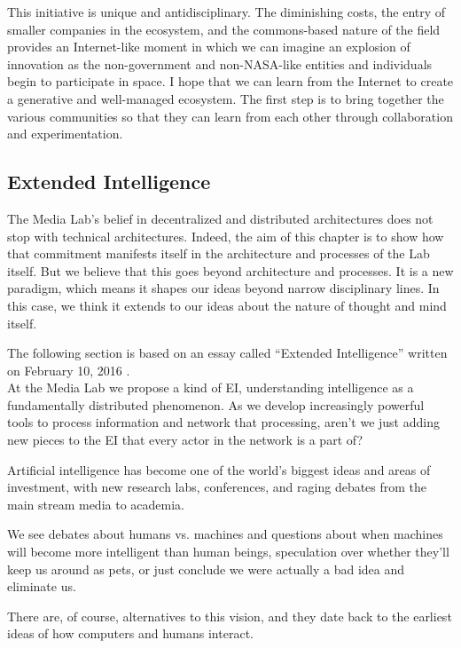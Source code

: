 This initiative is unique and antidisciplinary. The diminishing costs, the entry of smaller companies in the ecosystem, and the commons-based nature of the field provides an Internet-like moment in which we can imagine an explosion of innovation as the non-government and non-\ac{NASA}-like entities and individuals begin to participate in space. I hope that we can learn from the Internet to create a generative and well-managed ecosystem. The first step is to bring together the various communities so that they can learn from each other through collaboration and experimentation.

\subsection{Extended Intelligence}

The Media Lab's belief in decentralized and distributed architectures does not stop with technical architectures. Indeed, the aim of this chapter is to show how that commitment manifests itself in the architecture and processes of the Lab itself. But we believe that this goes beyond architecture and processes. It is a new paradigm, which means it shapes our ideas beyond narrow disciplinary lines. In this case, we think it extends to our ideas about the nature of thought and mind itself.

The following section is based on an essay called ``Extended Intelligence'' written on February 10, 2016 \cite{Extended52:online}. \\

At the Media Lab we propose a kind of \ac{EI}, understanding intelligence as a fundamentally distributed phenomenon. As we develop increasingly powerful tools to process information and network that processing, aren't we just adding new pieces to the \ac{EI} that every actor in the network is a part of?

Artificial intelligence has become one of the world's biggest ideas and areas of investment, with new research labs, conferences, and raging debates from the main stream media to academia.

We see debates about humans vs. machines and questions about when machines will become more intelligent than human beings, speculation over whether they'll keep us around as pets, or just conclude we were actually a bad idea and eliminate us.

There are, of course, alternatives to this vision, and they date back to the earliest ideas of how computers and humans interact.

